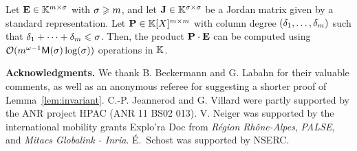 \documentclass[preprint]{sig-alternate-05-2015}
\begin{document}
\begin{cor}
  \label{cor:residual}
Let $\evMat \in \matSpace[\rdim][\order]$ with $\sigma \geqslant m$, and let
$\mulmat \in \matSpace[\order]$ be a Jordan matrix given by a standard
representation. Let $\mat{P} \in \polMatSpace[\rdim]$ with column degree
$(\delta_1,\ldots,\delta_m)$ such that $\delta_1 + \cdots +
\delta_m \leqslant \sigma$. Then, the product $\mat{P} \mul \evMat$ can be
computed using $\mathcal{O}( m^{\omega-1} \mathsf{M}(\sigma) \log(\sigma) )$
operations in $\mathbb{K}$.
\end{cor}

\noindent \textbf{Acknowledgments.} We thank B. Beckermann and G.
Labahn for their valuable comments, as well as an anonymous referee for suggesting a
shorter proof of Lemma~\ref{lem:invariant}. C.-P. Jeannerod and G. Villard
were partly supported by the ANR project HPAC (ANR 11 BS02 013). V.  Neiger was
supported by the international mobility grants Explo'ra Doc from \emph{R\'egion
Rh\^one-Alpes}, \emph{PALSE}, and \emph{Mitacs Globalink - Inria}. \'E.~Schost
was supported by NSERC.
\end{document}
